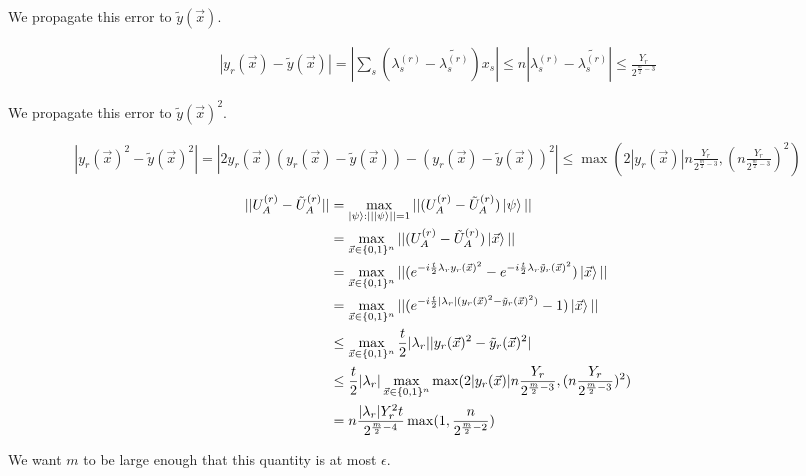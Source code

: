 We propagate this error to $\tilde{y}(\vec{x})$.

\begin{equation}
    \begin{split}
        |y_r(\vec{x}) - \tilde{y}(\vec{x})| = |\sum_s (\lambda^{(r)}_s - \tilde{\lambda^{(r)}_s})x_s| \leq n|\lambda^{(r)}_s - \tilde{\lambda^{(r)}_s}| \leq \frac{Y_r}{2^{\frac{m}{2} - 3}}
    \end{split}
\end{equation}

We propagate this error to $\tilde{y}(\vec{x})^2$.

\begin{equation}
    \begin{split}
        |y_r(\vec{x})^2 - \tilde{y}(\vec{x})^2| = |2y_r(\vec{x})(y_r(\vec{x}) - \tilde{y}(\vec{x})) - (y_r(\vec{x}) - \tilde{y}(\vec{x}))^2| \leq \max(2|y_r(\vec{x})|n\frac{Y_r}{2^{\frac{m}{2} - 3}}, (n\frac{Y_r}{2^{\frac{m}{2} - 3}})^2)
    \end{split}
\end{equation}

\begin{equation}
    \begin{split}
        ||U_A^{(r)} - \tilde{U}_A^{(r)}|| &= \max_{\ket{\psi} : ||\ket{\psi}|| = 1} ||(U_A^{(r)} - \tilde{U}_A^{(r)})\ket{\psi}|| \\
        &= \max_{\vec{x} \in \{0, 1\}^n} ||(U_A^{(r)} - \tilde{U}_A^{(r)})\ket{\vec{x}}|| \\
        &= \max_{\vec{x} \in \{0, 1\}^n} ||(e^{-i\frac{t}{2}\lambda_ry_r(\vec{x})^2} - e^{-i\frac{t}{2}\lambda_r\tilde{y}_r(\vec{x})^2})\ket{\vec{x}}|| \\
        &= \max_{\vec{x} \in \{0, 1\}^n} ||(e^{-i\frac{t}{2}|\lambda_r|(y_r(\vec{x})^2 - \tilde{y}_r(\vec{x})^2)} - 1)\ket{\vec{x}}|| \\
        &\leq \max_{\vec{x} \in \{0, 1\}^n} \frac{t}{2}|\lambda_r||y_r(\vec{x})^2 - \tilde{y}_r(\vec{x})^2| \\
        &\leq \frac{t}{2}|\lambda_r|\max_{\vec{x} \in \{0, 1\}^n} \max(2|y_r(\vec{x})|n\frac{Y_r}{2^{\frac{m}{2} - 3}}, (n\frac{Y_r}{2^{\frac{m}{2} - 3}})^2) \\
        &= n\frac{|\lambda_r| Y_r^2t}{2^{\frac{m}{2} - 4}}\max(1, \frac{n}{2^{\frac{m}{2} - 2}})
    \end{split}
\end{equation}

We want $m$ to be large enough that this quantity is at most $\epsilon$.

